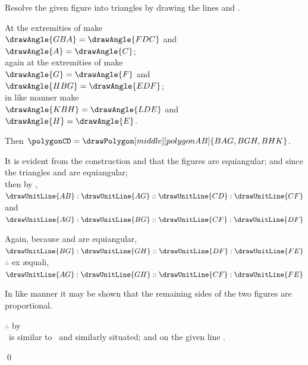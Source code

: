 \documentclass[booklanguage=english]{byrnebook}
\begin{document}
\begin{center}
Resolve the given figure into triangles by drawing the lines  and .

At the extremities of  make\\
$\drawAngle{GBA} = \drawAngle{FDC}$ and $\drawAngle{A} = \drawAngle{C}$;\\
again at the extremities of  make\\
$\drawAngle{G} = \drawAngle{F}$ and $\drawAngle{HBG} = \drawAngle{EDF}$;\\
in like manner make\\
$\drawAngle{KBH} = \drawAngle{LDE}$ and $\drawAngle{H} = \drawAngle{E}$.

Then $\polygonCD = \drawPolygon[middle][polygonAB]{BAG,BGH,BHK}$.

It is evident from the construction and  that the figures are equiangular; and since the triangles  and  are equiangular;\\
then by ,
$\drawUnitLine{AB}:\drawUnitLine{AG} :: \drawUnitLine{CD} : \drawUnitLine{CF}$\\
and $\drawUnitLine{AG}:\drawUnitLine{BG} :: \drawUnitLine{CF} : \drawUnitLine{DF}$

Again, because  and  are equiangular,\\
$\drawUnitLine{BG}:\drawUnitLine{GH} :: \drawUnitLine{DF} : \drawUnitLine{FE}$\\
$\therefore$ ex \ae quali,\\
$\drawUnitLine{AG}:\drawUnitLine{GH} :: \drawUnitLine{CF} : \drawUnitLine{FE}$  %

In like manner it may be shown that the remaining sides of the two figures are proportional.

$\therefore$ by \\
\polygonAB\ is similar to \polygonCD\ and similarly situated; and on the given line .
\end{center}

\qed
\end{document}
